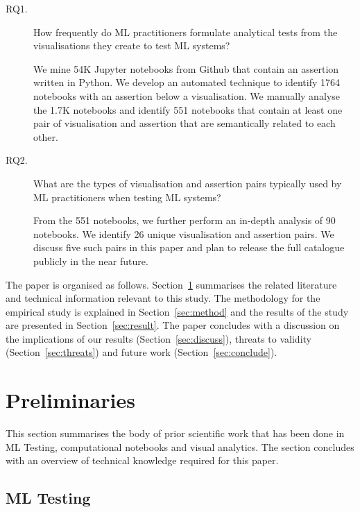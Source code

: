 \documentclass[conference]{IEEEtran}
\begin{document}
\begin{description}
\item[RQ1.] How frequently do ML practitioners formulate analytical tests from the visualisations they create to test ML systems?

We mine 54K Jupyter notebooks from Github that contain an assertion written in Python. We develop an automated technique to identify 1764 notebooks with an assertion below a visualisation. We manually analyse the 1.7K notebooks and identify 551 notebooks that contain at least one pair of visualisation and assertion that are semantically related to each other.

\item[RQ2.] What are the types of visualisation and assertion pairs typically used by ML practitioners when testing ML systems?

From the 551 notebooks, we further perform an in-depth analysis of 90 notebooks. We identify 26 unique visualisation and assertion pairs. We discuss five such pairs in this paper and plan to release the full catalogue publicly in the near future.

\end{description}


The paper is organised as follows. Section~\ref{sec:prelim} summarises the related literature and technical information relevant to this study. The methodology for the empirical study is explained in Section~\ref{sec:method} and the results of the study are presented in Section~\ref{sec:result}. The paper concludes with a discussion on the implications of our results (Section~\ref{sec:discuss}), threats to validity (Section~\ref{sec:threats}) and future work (Section~\ref{sec:conclude}).

\section{Preliminaries}\label{sec:prelim}


This section summarises the body of prior scientific work that has been done in ML Testing, computational notebooks and visual analytics. The section concludes with an overview of technical knowledge required for this paper.

\subsection{ML Testing}\label{sec:ml-testing}
\end{document}
